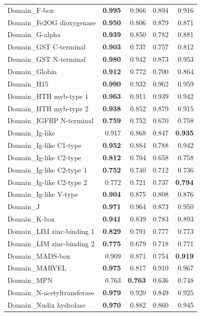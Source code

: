 \documentclass{article}
\begin{document}
\begin{longtable}{p{6.0cm}rrrr}
Domain\_F-box & \textbf{0.995} & 0.966 & 0.894 & 0.916 \\
Domain\_Fe2OG dioxygenase & \textbf{0.950} & 0.806 & 0.879 & 0.871 \\
Domain\_G-alpha & \textbf{0.939} & 0.850 & 0.782 & 0.881 \\
Domain\_GST C-terminal & \textbf{0.903} & 0.737 & 0.757 & 0.812 \\
Domain\_GST N-terminal & \textbf{0.980} & 0.942 & 0.873 & 0.953 \\
Domain\_Globin & \textbf{0.912} & 0.772 & 0.700 & 0.864 \\
Domain\_H15 & \textbf{0.990} & 0.932 & 0.962 & 0.959 \\
Domain\_HTH myb-type 1 & \textbf{0.963} & 0.911 & 0.939 & 0.942 \\
Domain\_HTH myb-type 2 & \textbf{0.938} & 0.852 & 0.879 & 0.915 \\
Domain\_IGFBP N-terminal & \textbf{0.759} & 0.752 & 0.670 & 0.758 \\
Domain\_Ig-like & 0.917 & 0.868 & 0.847 & \textbf{0.935} \\
Domain\_Ig-like C1-type & \textbf{0.952} & 0.884 & 0.788 & 0.942 \\
Domain\_Ig-like C2-type & \textbf{0.812} & 0.704 & 0.658 & 0.758 \\
Domain\_Ig-like C2-type 1 & \textbf{0.752} & 0.740 & 0.712 & 0.736 \\
Domain\_Ig-like C2-type 2 & 0.772 & 0.721 & 0.737 & \textbf{0.794} \\
Domain\_Ig-like V-type & \textbf{0.904} & 0.875 & 0.808 & 0.876 \\
Domain\_J & \textbf{0.971} & 0.964 & 0.873 & 0.950 \\
Domain\_K-box & \textbf{0.941} & 0.839 & 0.783 & 0.893 \\
Domain\_LIM zinc-binding 1 & \textbf{0.829} & 0.791 & 0.777 & 0.773 \\
Domain\_LIM zinc-binding 2 & \textbf{0.775} & 0.679 & 0.718 & 0.771 \\
Domain\_MADS-box & 0.909 & 0.871 & 0.754 & \textbf{0.919} \\
Domain\_MARVEL & \textbf{0.975} & 0.817 & 0.910 & 0.967 \\
Domain\_MPN & 0.763 & \textbf{0.763} & 0.636 & 0.748 \\
Domain\_N-acetyltransferase & \textbf{0.979} & 0.920 & 0.849 & 0.925 \\
Domain\_Nudix hydrolase & \textbf{0.970} & 0.882 & 0.860 & 0.945 \\

\end{longtable}
\end{document}
